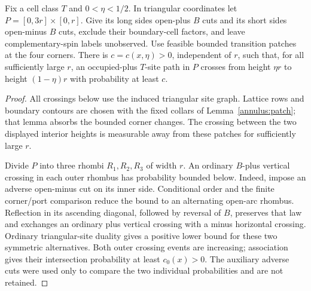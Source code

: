 \begin{lemma}
\label{annulus:straight-short}
Fix a cell class $T$ and $0<\eta<1/2$. In triangular coordinates let
$P=[0,3r]\times[0,r]$. Give its long sides open-plus $B$ cuts and
its short sides open-minus $B$ cuts, exclude their boundary-cell
factors, and leave complementary-spin labels unobserved. Use feasible
bounded transition patches at the four corners. There is
$c=c(x,\eta)>0$, independent of $r$, such that, for all sufficiently large $r$, an occupied-plus
$T$-site path in $P$ crosses from height $\eta r$ to height
$(1-\eta)r$ with probability at least $c$.
\end{lemma}
\begin{proof}
All crossings below use the induced triangular site graph. Lattice
rows and boundary contours are chosen with the fixed collars of
Lemma~\ref{annulus:patch}; that lemma absorbs the bounded corner
changes. The crossing between the two displayed interior heights is
measurable away from these patches for sufficiently large $r$.

Divide $P$ into three rhombi $R_1,R_2,R_3$ of width $r$. An ordinary
$B$-plus vertical crossing in each outer rhombus has probability bounded
below. Indeed, impose an adverse open-minus cut on its inner side.
Conditional order and the finite corner/port comparison reduce the
bound to an alternating open-arc rhombus. Reflection in its ascending
diagonal, followed by reversal of $B$, preserves that law and exchanges
an ordinary plus vertical crossing with a minus horizontal crossing.
Ordinary triangular-site duality gives a positive lower bound for
these two symmetric alternatives. Both outer crossing events are
increasing; association gives their intersection probability at least
$c_0(x)>0$. The auxiliary adverse cuts were used only to compare the
two individual probabilities and are not retained.


\end{proof}
